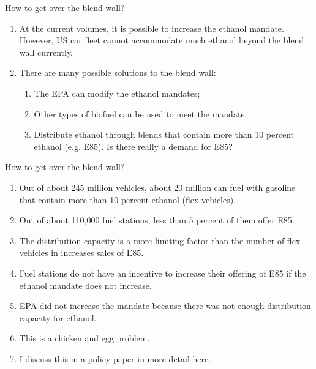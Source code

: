 \documentclass[table,xcolor=pdftex,dvipsnames]{beamer}\usepackage[]{graphicx}\usepackage[]{color}
\begin{document}

\begin{frame}{How to get over the blend wall?}
\begin{enumerate}[label=\textbullet]
    \item At the current volumes, it is possible to increase the ethanol mandate. However, US car fleet cannot accommodate much ethanol beyond the blend wall currently.
    \item There are many possible solutions to the blend wall:
    \begin{enumerate}[label=-]
        \item The EPA can modify the ethanol mandates;
        \item Other types of biofuel can be used to meet the mandate.
        \item Distribute ethanol through blends that contain more than 10 percent ethanol (e.g. E85). Is there really a demand for E85?
    \end{enumerate}
\end{enumerate}
\end{frame}


\begin{frame}{How to get over the blend wall?}
\begin{enumerate}[label=\textbullet]
    \item Out of about 245 million vehicles, about 20 million can fuel with gasoline that contain more than 10 percent ethanol (flex vehicles).
    \item Out of about 110,000 fuel stations, less than 5 percent of them offer E85.
    \item The distribution capacity is a more limiting factor than the number of flex vehicles in increases sales of E85.
    \item Fuel stations do not have an incentive to increase their offering of E85 if the ethanol mandate does not increase.
    \item EPA did not increase the mandate because there was not enough distribution capacity for ethanol.
    \item This is a chicken and egg problem.
    \item I discuss this in a policy paper in more detail \href{http://www.card.iastate.edu/ag_policy_review/display.aspx?id=10}{here}.
\end{enumerate}
\end{frame}
\end{document}
